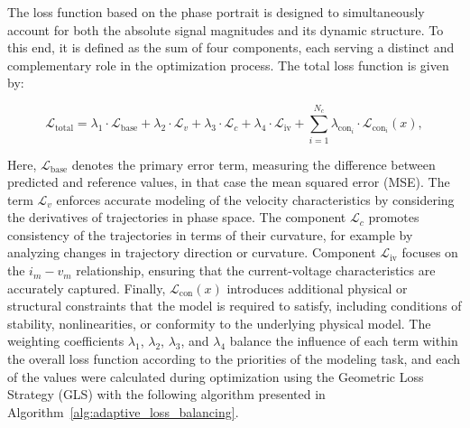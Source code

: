 \documentclass[11pt, oneside]{article}
\begin{document}
The loss function based on the phase portrait is designed to simultaneously account for both the absolute signal magnitudes and its dynamic structure. To this end, it is defined as the sum of four components, each serving a distinct and complementary role in the optimization process. The total loss function is given by:

\begin{equation}
    \mathcal{L}_{\mathrm{total}} = \lambda_1 \cdot \mathcal{L}_{\mathrm{base}} + \lambda_2 \cdot \mathcal{L}_{v} + \lambda_3 \cdot \mathcal{L}_{c} + \lambda_4\cdot\mathcal{L}_{\mathrm{iv}} +\sum^{N_c}_{i=1} \lambda_{\mathrm{con}_i} \cdot \mathcal{L}_{\mathrm{con}_i}(x),
    \label{eq:loss_function}
\end{equation}

Here, $\mathcal{L}_{\mathrm{base}}$ denotes the primary error term,  measuring the difference between predicted and reference values, in that case the mean squared error (MSE). The term $\mathcal{L}_{v}$ enforces accurate modeling of the velocity characteristics by considering the derivatives of trajectories in phase space. The component $\mathcal{L}_{c}$ promotes consistency of the trajectories in terms of their curvature, for example by analyzing changes in trajectory direction or curvature.
Component $\mathcal{L}_{\mathrm{iv}}$ focuses on the $i_m-v_m$ relationship, ensuring that the current-voltage characteristics are accurately captured. Finally, $\mathcal{L}_{\mathrm{con}}(x)$ introduces additional physical or structural constraints that the model is required to satisfy, including conditions of stability, nonlinearities, or conformity to the underlying physical model. The weighting coefficients $\lambda_1$, $\lambda_2$, $\lambda_3$, and $\lambda_4$ balance the influence of each term within the overall loss function according to the priorities of the modeling task, and each of the values were calculated during optimization using the Geometric Loss Strategy (GLS) with the following algorithm presented in Algorithm~\ref{alg:adaptive_loss_balancing}.
\end{document}
